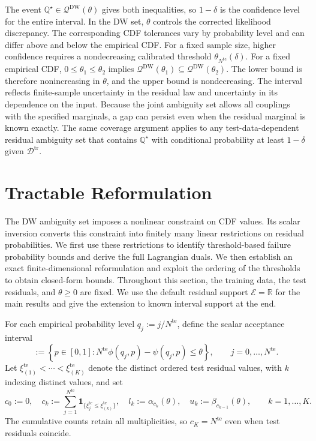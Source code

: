 \documentclass[review,11pt,3p,authoryear,nopreprintline]{elsarticle}
\begin{document}
The event $\mathbb Q^\star\in\mathcal Q^{\mathrm{DW}}(\theta)$ gives both inequalities, so $1-\delta$ is the confidence level for the entire interval. In the DW set, $\theta$ controls the corrected likelihood discrepancy. The corresponding CDF tolerances vary by probability level and can differ above and below the empirical CDF. For a fixed sample size, higher confidence requires a nondecreasing calibrated threshold $\theta_{N^{\mathrm{te}}}(\delta)$. For a fixed empirical CDF, $0\le\theta_1\le\theta_2$ implies $\mathcal Q^{\mathrm{DW}}(\theta_1)\subseteq\mathcal Q^{\mathrm{DW}}(\theta_2)$. The lower bound is therefore nonincreasing in $\theta$, and the upper bound is nondecreasing. The interval reflects finite-sample uncertainty in the residual law and uncertainty in its dependence on the input. Because the joint ambiguity set allows all couplings with the specified marginals, a gap can persist even when the residual marginal is known exactly. The same coverage argument applies to any test-data-dependent residual ambiguity set that contains $\mathbb Q^\star$ with conditional probability at least $1-\delta$ given $\mathcal D^{\mathrm{tr}}$.


\section{Tractable Reformulation}
\label{sec-reformulation}

The DW ambiguity set imposes a nonlinear constraint on CDF values. Its scalar inversion converts this constraint into finitely many linear restrictions on residual probabilities. We first use these restrictions to identify threshold-based failure probability bounds and derive the full Lagrangian duals. We then establish an exact finite-dimensional reformulation and exploit the ordering of the thresholds to obtain closed-form bounds. Throughout this section, the training data, the test residuals, and $\theta\ge0$ are fixed. We use the default residual support $\mathcal E=\mathbb R$ for the main results and give the extension to known interval support at the end.

For each empirical probability level $q_j:=j/N^{\mathrm{te}}$, define the scalar acceptance interval
\begin{equation}
  [\alpha_j(\theta),\beta_j(\theta)]
  :=\left\{p\in[0,1]:
  N^{\mathrm{te}}\phi(q_j,p)-\psi(q_j,p)\le\theta\right\},
  \qquad j=0,\ldots,N^{\mathrm{te}}.
  \label{eq-dw-rank-acceptance}
\end{equation}
Let $\xi_{(1)}^{\mathrm{te}}<\cdots<\xi_{(K)}^{\mathrm{te}}$ denote the distinct ordered test residual values, with $k$ indexing distinct values, and set
\begin{equation} 
    c_0 :=0, \quad
    c_k :=\sum_{j=1}^{N^{\mathrm{te}}}\mathbf1_{\{\xi_j^{\mathrm{te}}\le\xi_{(k)}^{\mathrm{te}}\}}, \quad
    l_k :=\alpha_{c_k}(\theta),  \quad
    u_k :=\beta_{c_{k-1}}(\theta),\qquad k=1,\ldots,K. 
  \label{eq-dw-counts-and-levels}
\end{equation}
The cumulative counts retain all multiplicities, so $c_K=N^{\mathrm{te}}$ even when test residuals coincide.
\end{document}
